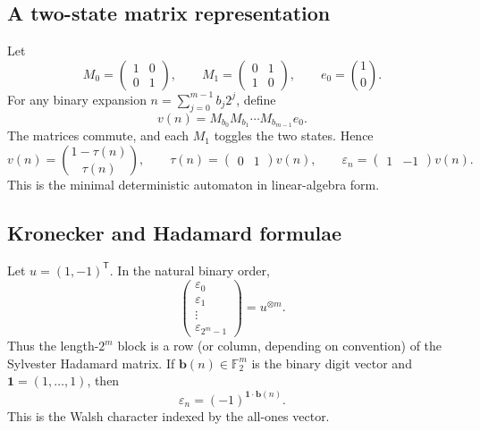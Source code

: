 \documentclass[11pt,oneside]{article}
\theoremstyle{definition}
\theoremstyle{remark}
\newcommand{\Ftwo}{\mathbb F_2}
\begin{document}
\subsection{A two-state matrix representation}

Let
\begin{equation}
 M_0=\begin{pmatrix}1&0\\0&1\end{pmatrix},
 \qquad
 M_1=\begin{pmatrix}0&1\\1&0\end{pmatrix},
 \qquad
 e_0=\binom10.
 \label{eq:automaton-matrices}
\end{equation}
For any binary expansion \(n=\sum_{j=0}^{m-1}b_j2^j\), define
\begin{equation}
 v(n)=M_{b_0}M_{b_1}\cdots M_{b_{m-1}}e_0.
 \label{eq:state-vector}
\end{equation}
The matrices commute, and each \(M_1\) toggles the two states.  Hence
\begin{equation}
 v(n)=\binom{1-\tau(n)}{\tau(n)},
 \qquad
 \tau(n)=\begin{pmatrix}0&1\end{pmatrix}v(n),
 \qquad
 \varepsilon_n=\begin{pmatrix}1&-1\end{pmatrix}v(n).
 \label{eq:matrix-output}
\end{equation}
This is the minimal deterministic automaton in linear-algebra form.

\subsection{Kronecker and Hadamard formulae}

Let \(u=(1,-1)^{\mathsf T}\).  In the natural binary order,
\begin{equation}
 \begin{pmatrix}
 \varepsilon_0\\ \varepsilon_1\\ \vdots\\ \varepsilon_{2^m-1}
 \end{pmatrix}
 =u^{\otimes m}.
 \label{eq:kronecker}
\end{equation}
Thus the length-\(2^m\) block is a row (or column, depending on convention) of
the Sylvester Hadamard matrix.  If \(\bm b(n)\in\Ftwo^m\) is the binary digit
vector and \(\bm 1=(1,\ldots,1)\), then
\begin{equation}
 \varepsilon_n=(-1)^{\bm1\cdot\bm b(n)}.
 \label{eq:walsh-character}
\end{equation}
This is the Walsh character indexed by the all-ones vector.
\end{document}
